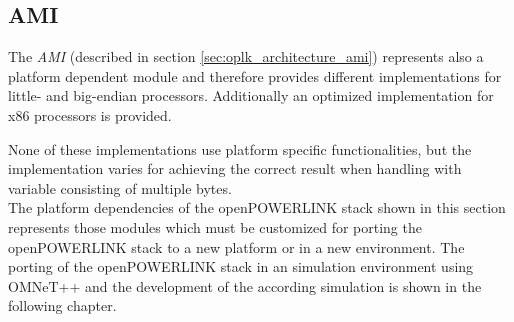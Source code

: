 \subsection{AMI}
\label{sec:oplk_platform_ami}

The \emph{AMI} (described in section \ref{sec:oplk_architecture_ami}) represents also a platform dependent module and therefore provides different implementations for little- and big-endian processors.
Additionally an optimized implementation for x86 processors is provided.

None of these implementations use platform specific functionalities, but the implementation varies for achieving the correct result when handling with variable consisting of multiple bytes.
\\

The platform dependencies of the openPOWERLINK stack shown in this section represents those modules which must be customized for porting the openPOWERLINK stack to a new platform or in a new environment.
The porting of the openPOWERLINK stack in an simulation environment using OMNeT++ and the development of the according simulation is shown in the following chapter.